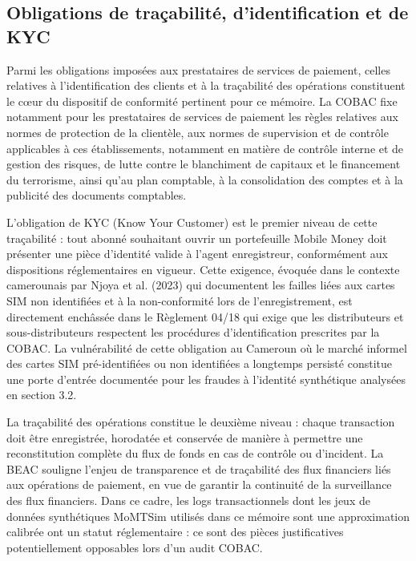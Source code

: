 \documentclass[11pt,a4paper,oneside]{report}
\theoremstyle{definition}
\theoremstyle{remark}
\begin{document}
\subsection{Obligations de traçabilité, d'identification et de KYC}

Parmi les obligations imposées aux prestataires de services de paiement, celles relatives à l'identification des clients et à la traçabilité des opérations constituent le cœur du dispositif de conformité pertinent pour ce mémoire. La COBAC fixe notamment pour les prestataires de services de paiement les règles relatives aux normes de protection de la clientèle, aux normes de supervision et de contrôle applicables à ces établissements, notamment en matière de contrôle interne et de gestion des risques, de lutte contre le blanchiment de capitaux et le financement du terrorisme, ainsi qu'au plan comptable, à la consolidation des comptes et à la publicité des documents comptables.

L'obligation de KYC (Know Your Customer) est le premier niveau de cette traçabilité : tout abonné souhaitant ouvrir un portefeuille Mobile Money doit présenter une pièce d'identité valide à l'agent enregistreur, conformément aux dispositions réglementaires en vigueur. Cette exigence, évoquée dans le contexte camerounais par Njoya et al. (2023) qui documentent les failles liées aux cartes SIM non identifiées et à la non-conformité lors de l'enregistrement, est directement enchâssée dans le Règlement 04/18 qui exige que les distributeurs et sous-distributeurs respectent les procédures d'identification prescrites par la COBAC. La vulnérabilité de cette obligation au Cameroun  où le marché informel des cartes SIM pré-identifiées ou non identifiées a longtemps persisté  constitue une porte d'entrée documentée pour les fraudes à l'identité synthétique analysées en section 3.2.

La traçabilité des opérations constitue le deuxième niveau : chaque transaction doit être enregistrée, horodatée et conservée de manière à permettre une reconstitution complète du flux de fonds en cas de contrôle ou d'incident. La BEAC souligne l'enjeu de transparence et de traçabilité des flux financiers liés aux opérations de paiement, en vue de garantir la continuité de la surveillance des flux financiers. Dans ce cadre, les logs transactionnels  dont les jeux de données synthétiques MoMTSim utilisés dans ce mémoire sont une approximation calibrée  ont un statut réglementaire : ce sont des pièces justificatives potentiellement opposables lors d'un audit COBAC.
\end{document}
